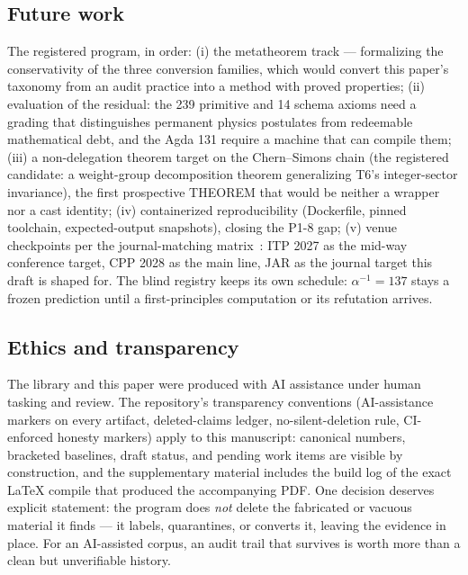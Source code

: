 \subsection{Future work}
\label{sec:future}
The registered program, in order: (i) the metatheorem track ---
formalizing the conservativity of the three conversion families,
which would convert this paper's taxonomy from an audit practice
into a method with proved properties; (ii) evaluation of the
residual: the 239 primitive and 14 schema axioms need a grading
that distinguishes permanent physics postulates from redeemable
mathematical debt, and the Agda 131 require a machine that can
compile them; (iii) a non-delegation theorem target on the
Chern--Simons chain (the registered candidate: a weight-group
decomposition theorem generalizing T6's integer-sector
invariance), the first prospective THEOREM that would be neither
a wrapper nor a cast identity; (iv) containerized reproducibility
(Dockerfile, pinned toolchain, expected-output snapshots), closing
the P1-8 gap; (v) venue checkpoints per the journal-matching
matrix~\cite{sylvad2matrix2026}: ITP 2027 as the mid-way conference target, CPP 2028 as
the main line, JAR as the journal target this draft is shaped
for. The blind registry keeps its own schedule: $\alpha^{-1} =
137$ stays a frozen prediction until a first-principles
computation or its refutation arrives.

\subsection{Ethics and transparency}
\label{sec:ethics}
The library and this paper were produced with AI assistance under
human tasking and review. The repository's transparency conventions
(AI-assistance markers on every artifact, deleted-claims ledger,
no-silent-deletion rule, CI-enforced honesty markers) apply to this
manuscript: canonical numbers, bracketed baselines, draft status,
and pending work items are visible by construction, and the
supplementary material includes the build log of the exact
\LaTeX{} compile that produced the accompanying PDF. One decision
deserves explicit statement: the program does \emph{not} delete the
fabricated or vacuous material it finds --- it labels, quarantines,
or converts it, leaving the evidence in place. For an AI-assisted
corpus, an audit trail that survives is worth more than a clean
but unverifiable history.
